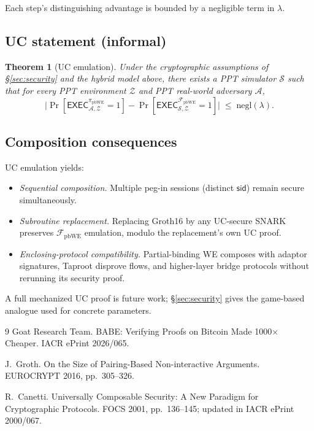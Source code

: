 \documentclass[11pt]{article}
\newtheorem{theorem}{Theorem}
\newcommand{\negl}{\mathrm{negl}}
\begin{document}
Each step's distinguishing advantage is bounded by a negligible
term in $\lambda$.

\subsection{UC statement (informal)}

\begin{theorem}[UC emulation]\label{thm:uc}
Under the cryptographic assumptions of \S\ref{sec:security} and the
hybrid model above, there exists a PPT simulator $\mathcal{S}$ such
that for every PPT environment $\mathcal{Z}$ and PPT real-world
adversary $\mathcal{A}$,
\[
  \bigl|\Pr[\mathsf{EXEC}^{\pi_{\mathrm{pbWE}}}_{\mathcal{A}, \mathcal{Z}} = 1]
       - \Pr[\mathsf{EXEC}^{\mathcal{F}_{\mathrm{pbWE}}}_{\mathcal{S}, \mathcal{Z}} = 1]\bigr|
  \;\leq\; \negl(\lambda).
\]
\end{theorem}

\subsection{Composition consequences}

UC emulation yields:
\begin{itemize}
  \item \emph{Sequential composition.} Multiple peg-in sessions
    (distinct $\mathsf{sid}$) remain secure simultaneously.
  \item \emph{Subroutine replacement.} Replacing Groth16 by any
    UC-secure SNARK preserves $\mathcal{F}_{\mathrm{pbWE}}$
    emulation, modulo the replacement's own UC proof.
  \item \emph{Enclosing-protocol compatibility.} Partial-binding WE
    composes with adaptor signatures, Taproot disprove flows, and
    higher-layer bridge protocols without rerunning its security
    proof.
\end{itemize}

A full mechanized UC proof is future work; \S\ref{sec:security} gives
the game-based analogue used for concrete parameters.

\begin{thebibliography}{9}
Goat Research Team.
\newblock BABE: Verifying Proofs on Bitcoin Made 1000$\times$ Cheaper.
\newblock IACR ePrint 2026/065.

J.~Groth.
\newblock On the Size of Pairing-Based Non-interactive Arguments.
\newblock EUROCRYPT 2016, pp.\ 305--326.

R.~Canetti.
\newblock Universally Composable Security: A New Paradigm for
Cryptographic Protocols.
\newblock FOCS 2001, pp.\ 136--145; updated in IACR ePrint 2000/067.
\end{thebibliography}
\end{document}
